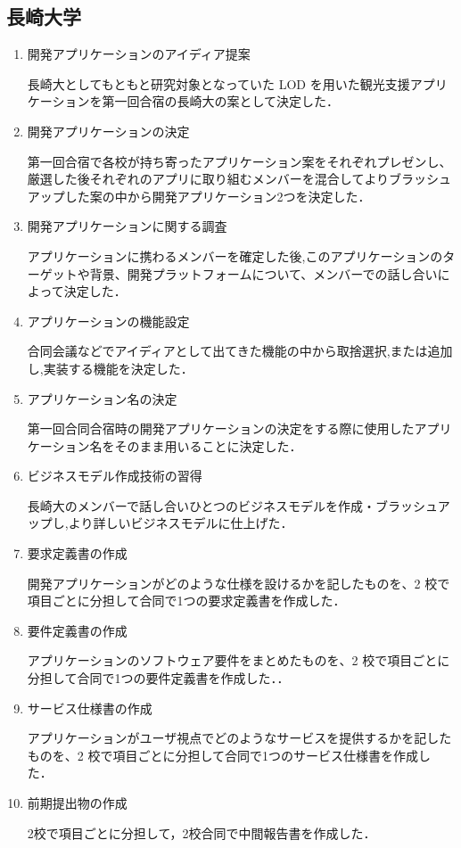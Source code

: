 \subsection{長崎大学}
\begin{enumerate}
\item 開発アプリケーションのアイディア提案 
\par 長崎大としてもともと研究対象となっていた LOD を用いた観光支援アプリケーションを第一回合宿の長崎大の案として決定した．
\item 開発アプリケーションの決定 
\par 第一回合宿で各校が持ち寄ったアプリケーション案をそれぞれプレゼンし、厳選した後それぞれのアプリに取り組むメンバーを混合してよりブラッシュアップした案の中から開発アプリケーション2つを決定した． 
\item 開発アプリケーションに関する調査 
\par  アプリケーションに携わるメンバーを確定した後,このアプリケーションのターゲットや背景、開発プラットフォームについて、メンバーでの話し合いによって決定した．
\item アプリケーションの機能設定 
\par 合同会議などでアイディアとして出てきた機能の中から取捨選択,または追加し,実装する機能を決定した． 
\item アプリケーション名の決定 
\par 第一回合同合宿時の開発アプリケーションの決定をする際に使用したアプリケーション名をそのまま用いることに決定した．
\item ビジネスモデル作成技術の習得 
\par 長崎大のメンバーで話し合いひとつのビジネスモデルを作成・ブラッシュアップし,より詳しいビジネスモデルに仕上げた．
\item 要求定義書の作成 
\par 開発アプリケーションがどのような仕様を設けるかを記したものを、2 校で項目ごとに分担して合同で1つの要求定義書を作成した． 
\item 要件定義書の作成 
\par アプリケーションのソフトウェア要件をまとめたものを、2 校で項目ごとに分担して合同で1つの要件定義書を作成した．． 
\item サービス仕様書の作成 
\par アプリケーションがユーザ視点でどのようなサービスを提供するかを記したものを、2 校で項目ごとに分担して合同で1つのサービス仕様書を作成した．
\item 前期提出物の作成 
\par 2校で項目ごとに分担して，2校合同で中間報告書を作成した． 
\end{enumerate}
